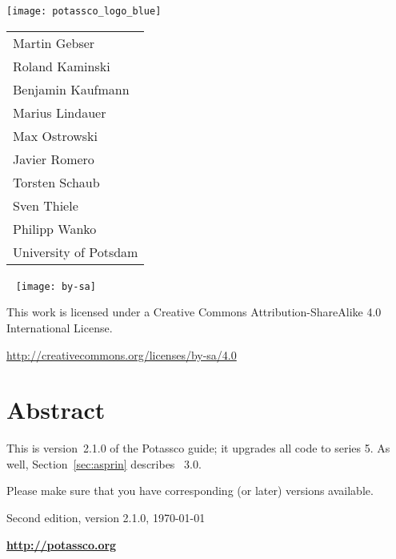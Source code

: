 \thispagestyle{empty}
\bigskip
\noindent
\texttt{[image: potassco\_logo\_blue]}
\bigskip

\vfill

\hspace{5pt}
{\Large\color{potcolor}
\begin{tabular}{l}
Martin Gebser \\
Roland Kaminski \\
Benjamin Kaufmann \\
Marius Lindauer \\
Max Ostrowski \\
Javier Romero \\
Torsten Schaub \\
Sven Thiele \\
Philipp Wanko \\[30pt]
University of Potsdam
\end{tabular}}

\newpage
\thispagestyle{empty}\
\vfill
\noindent
\texttt{[image: by-sa]}

\bigskip

\noindent
This work is licensed under a Creative Commons Attribution-ShareAlike 4.0\\ International License.

\medskip

\noindent
\url{http://creativecommons.org/licenses/by-sa/4.0}
\newpage
\thispagestyle{empty}\
\section*{Abstract}


\bigskip
\noindent
This is version~2.1.0 of the Potassco guide;
it upgrades all code to \clingo{} series 5.
As well, Section~\ref{sec:asprin} describes \asprin~3.0.

\medskip
\noindent
Please make sure that you have corresponding (or later) versions available.

\vfill

\begin{center}

\end{center}

\vfill

\noindent
Second edition, version 2.1.0, \today\ %

\bigskip
\noindent
{\LARGE\bf\url{http://potassco.org}}





